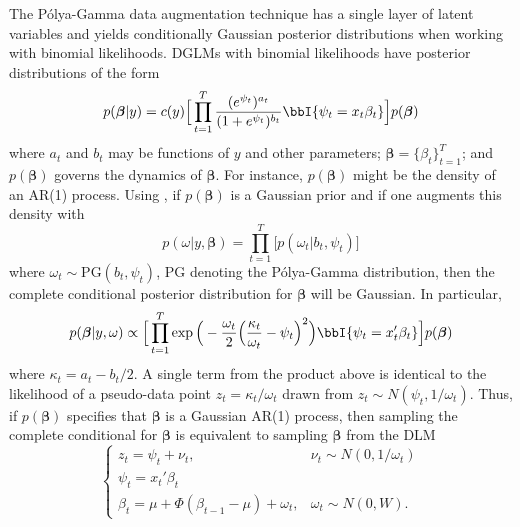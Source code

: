\documentclass[12pt]{article}
\newcommand{\Polya}{P\'{o}lya}
\newcommand{\PG}{\text{PG}}
\newcommand{\bbeta}{\boldsymbol{\beta}}
\begin{document}
The \Polya-Gamma data augmentation technique \citep{polson-etal-2013} has a
single layer of latent variables and yields conditionally Gaussian posterior
distributions when working with binomial likelihoods.  DGLMs with binomial
likelihoods have posterior distributions of the form
\[
p(\bbeta | y) = c(y) \Big[ \prod_{t=1}^T
\frac{(e^{\psi_t})^{a_t}}{(1+e^{\psi_t})^{b_t}} \bbI \{\psi_t = x_t \beta_t\}
\Big] p(\bbeta)
\]
where $a_t$ and $b_t$ may be functions of $y$ and other parameters; $\bbeta =
\{\beta_t\}_{t=1}^T$; and $p(\bbeta)$ governs the dynamics of $\bbeta$.  For
instance, $p(\bbeta)$ might be the density of an AR(1) process.  Using
\cite{polson-etal-2013}, if $p(\bbeta)$ is a Gaussian prior and if one augments
this density with
\begin{equation}
\label{eqn:augmentation}
p(\omega | y, \bbeta) = \prod_{t=1}^T \Big[ p(\omega_t | b_t, \psi_t)
\Big]
\end{equation}
where $\omega_t \sim \PG(b_t, \psi_t)$, PG denoting the \Polya-Gamma
distribution, then the complete conditional posterior distribution for $\bbeta$
will be Gaussian.  In particular,
\[
p(\bbeta | y, \omega) 
\propto 
\Big[ \prod_{t=1}^T \exp 
\Big(-\frac{\omega_t}{2} \Big(\frac{\kappa_t}{\omega_t} - \psi_t\Big)^2 \Big)
\bbI \{\psi_t = x_t' \beta_t\} \Big] p(\bbeta)
\]
where $\kappa_t = a_t - b_t / 2$.  A single term from the product above is
identical to the likelihood of a pseudo-data point $z_t = \kappa_t / \omega_t$
drawn from $z_t \sim N(\psi_t, 1/\omega_t)$.  Thus, if $p(\bbeta)$ specifies
that $\bbeta$ is a Gaussian AR(1) process, then sampling the complete
conditional for $\bbeta$ is equivalent to sampling $\bbeta$ from the DLM
\[
\begin{cases}
z_t = \psi_t + \nu_t, & \nu_t \sim N(0, 1/\omega_t) \\
\psi_t = x_t' \beta_t \\
\beta_t = \mu + \Phi (\beta_{t-1} - \mu) + \omega_t, & \omega_t \sim N(0, W).
\end{cases}
\]
\end{document}
